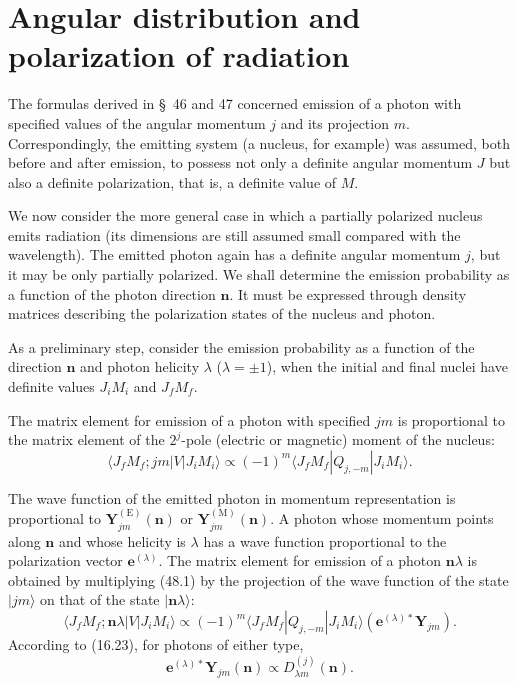 \section{Angular distribution and polarization of radiation}

The formulas derived in \S~46 and 47 concerned emission of a photon with specified values of the angular momentum $j$ and its projection $m$. Correspondingly, the emitting system (a nucleus, for example) was assumed, both before and after emission, to possess not only a definite angular momentum $J$ but also a definite polarization, that is, a definite value of $M$.

We now consider the more general case in which a partially polarized nucleus emits radiation (its dimensions are still assumed small compared with the wavelength). The emitted photon again has a definite angular momentum $j$, but it may be only partially polarized. We shall determine the emission probability as a function of the photon direction $\mathbf n$. It must be expressed through density matrices describing the polarization states of the nucleus and photon.

As a preliminary step, consider the emission probability as a function of the direction $\mathbf n$ and photon helicity $\lambda$ ($\lambda=\pm1$), when the initial and final nuclei have definite values $J_iM_i$ and $J_fM_f$.

The matrix element for emission of a photon with specified $jm$ is proportional to the matrix element of the $2^j$-pole (electric or magnetic) moment of the nucleus:
\begin{equation}
\langle J_fM_f;jm|V|J_iM_i\rangle
\propto(-1)^m\langle J_fM_f|Q_{j,-m}|J_iM_i\rangle.
\tag{48.1}
\end{equation}

The wave function of the emitted photon in momentum representation is proportional to $\mathbf Y_{jm}^{(\mathrm E)}(\mathbf n)$ or $\mathbf Y_{jm}^{(\mathrm M)}(\mathbf n)$. A photon whose momentum points along $\mathbf n$ and whose helicity is $\lambda$ has a wave function proportional to the polarization vector $\mathbf e^{(\lambda)}$. The matrix element for emission of a photon $\mathbf n\lambda$ is obtained by multiplying (48.1) by the projection of the wave function of the state $|jm\rangle$ on that of the state $|\mathbf n\lambda\rangle$:
\[
\langle J_fM_f;\mathbf n\lambda|V|J_iM_i\rangle
\propto(-1)^m\langle J_fM_f|Q_{j,-m}|J_iM_i\rangle
(\mathbf e^{(\lambda)*}\mathbf Y_{jm}).
\]
According to (16.23), for photons of either type,
\begin{equation}
\mathbf e^{(\lambda)*}\mathbf Y_{jm}(\mathbf n)
\propto D_{\lambda m}^{(j)}(\mathbf n).
\tag{48.2}
\end{equation}

